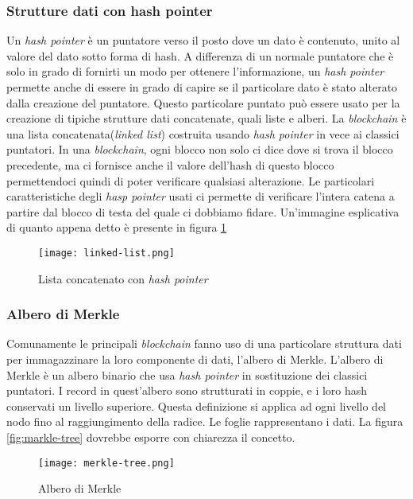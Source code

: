 \subsubsection{Strutture dati con hash pointer}
Un \emph{hash pointer} è un puntatore verso il posto dove un dato è contenuto, unito al valore del dato sotto forma di hash. A differenza di un normale puntatore che è solo in grado di fornirti un modo per ottenere l'informazione, un \emph{hash pointer} permette anche di essere in grado di capire se il particolare dato è stato alterato dalla creazione del puntatore. Questo particolare puntato può essere usato per la creazione di tipiche strutture dati concatenate, quali liste e alberi. La \emph{blockchain} è una lista concatenata(\emph{linked list}) costruita usando \emph{hash pointer} in vece ai classici puntatori. In una \emph{blockchain}, ogni blocco non solo ci dice dove si trova il blocco precedente, ma ci fornisce anche il valore dell'hash di questo blocco permettendoci quindi di poter verificare qualsiasi alterazione. Le particolari caratteristiche degli \emph{hasp pointer} usati ci permette di verificare l'intera catena a partire dal blocco di testa del quale ci dobbiamo fidare. 
Un'immagine esplicativa di quanto appena detto è presente in figura \ref{fig:linked-list}

\begin{figure}[!h]
    \centering
    \texttt{[image: linked-list.png]}
    \caption{Lista concatenato con \emph{hash pointer}}
    \label{fig:linked-list} 
\end{figure}

\subsubsection{Albero di Merkle}
Comunamente le principali \emph{blockchain} fanno uso di una particolare struttura dati per immagazzinare la loro componente di dati, l'albero di Merkle. L'albero di Merkle è un albero binario che usa \emph{hash pointer} in sostituzione dei classici puntatori. I record in quest'albero sono strutturati in coppie, e i loro hash conservati un livello superiore. Questa definizione si applica ad ogni livello del nodo fino al raggiungimento della radice. Le foglie rappresentano i dati. La figura \ref{fig:markle-tree} dovrebbe esporre con chiarezza il concetto.

\begin{figure}[!h]
    \centering
    \texttt{[image: merkle-tree.png]}
    \caption{Albero di Merkle}
    \label{fig:merkle-tree} 
\end{figure}

